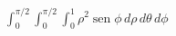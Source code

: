 \item $\int_0^{\pi/2} \int_0^{\pi/2} \int_0^1 \rho^2 \operatorname{sen} \phi \, d\rho \, d\theta \, d\phi$
